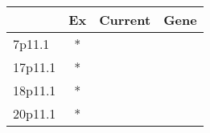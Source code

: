 \begin{tabular}{lccr}
\toprule
{} & Ex & Current & Gene \\
\midrule
7p11.1  &  * &         &      \\
17p11.1 &  * &         &      \\
18p11.1 &  * &         &      \\
20p11.1 &  * &         &      \\
\bottomrule
\end{tabular}
